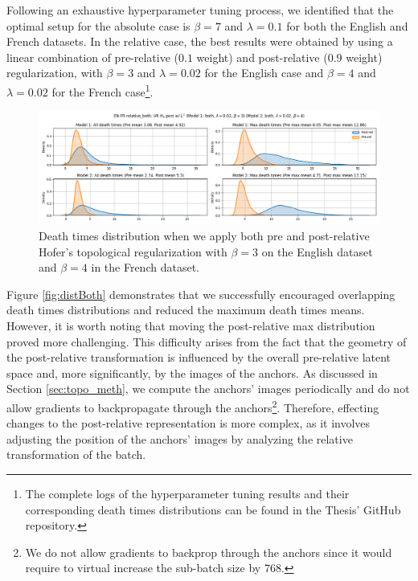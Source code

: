 \documentclass[../main.tex]{subfiles}
\begin{document}
Following an exhaustive hyperparameter tuning process, we identified that the optimal setup for the absolute case is $\beta=7$ and $\lambda=0.1$ for both the English and French datasets. In the relative case, the best results were obtained by using a linear combination of pre-relative ($0.1$ weight) and post-relative ($0.9$ weight) regularization, with $\beta=3$ and $\lambda=0.02$ for the English case and $\beta=4$ and $\lambda=0.02$ for the French case\footnote{The complete logs of the hyperparameter tuning results and their corresponding death times distributions can be found in the Thesis' GitHub repository.}.


\begin{figure}[!ht]
    \centering
    \includegraphics[width=\textwidth]{figures/rs/en_fr_relative_both_both_both_3_4_seed1.png} 
    \caption{Death times distribution when we apply both pre and post-relative Hofer's topological regularization with $\beta=3$ on the English dataset and $\beta=4$ in the French dataset.}
    \label{fig:distPost}
\end{figure}


Figure \ref{fig:distBoth} demonstrates that we successfully encouraged overlapping death times distributions and reduced the maximum death times means. However, it is worth noting that moving the post-relative max distribution proved more challenging. This difficulty arises from the fact that the geometry of the post-relative transformation is influenced by the overall pre-relative latent space and, more significantly, by the images of the anchors. As discussed in Section \ref{sec:topo_meth}, we compute the anchors' images periodically and do not allow gradients to backpropagate through the anchors\footnote{We do not allow gradients to backprop through the anchors since it would require to virtual increase the sub-batch size by 768.}. Therefore, effecting changes to the post-relative representation is more complex, as it involves adjusting the position of the anchors' images by analyzing the relative transformation of the batch.\\
\end{document}
